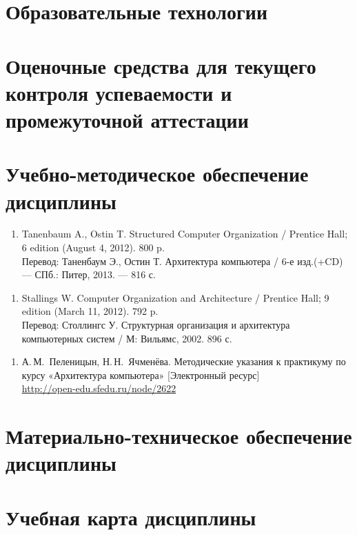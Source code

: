 \section{Образовательные технологии}

\section{Оценочные средства для текущего контроля успеваемости и промежуточной аттестации}

\section{Учебно-методическое обеспечение дисциплины}


\begin{enumerate}
	\item Tanenbaum A., Ostin T. Structured Computer Organization / Prentice Hall; 6 edition (August 4, 2012). 800 p.\\
	Перевод: Таненбаум Э., Остин Т. Архитектура компьютера / 6-е изд.(+CD) — СПб.: Питер, 2013. — 816 с.
\end{enumerate}

\begin{enumerate}
	\item Stallings W. Computer Organization and Architecture /  Prentice Hall; 9 edition (March 11, 2012). 792 p.\\
	Перевод: Столлингс У. Структурная организация и архитектура компьютерных систем / М: Вильямс, 2002. 896 с.
\end{enumerate}

\begin{enumerate}
	\item А.\,М.~Пеленицын, Н.\,Н.~Ячменёва. Методические указания к практикуму по курсу «Архитектура компьютера» [Электронный ресурс]\\
	\url{http://open-edu.sfedu.ru/node/2622}
\end{enumerate}


\section{Материально-техническое обеспечение дисциплины}
	



\section{Учебная карта дисциплины}



